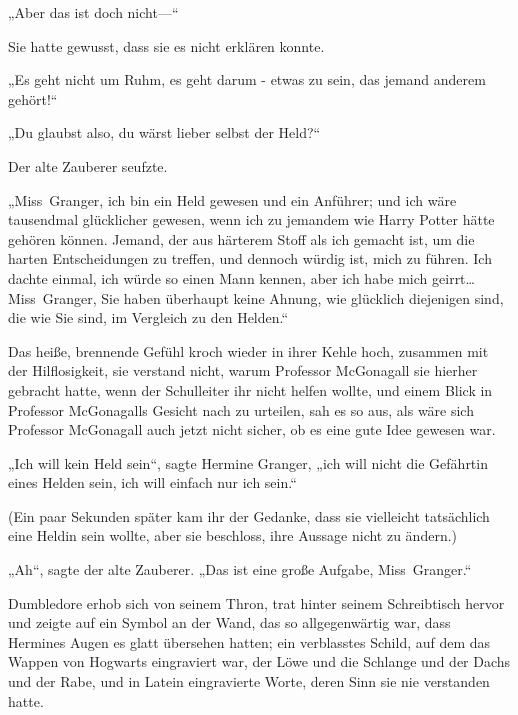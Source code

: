 {„Aber das ist doch nicht—“

Sie hatte gewusst, dass sie es nicht erklären konnte.

„Es geht nicht um Ruhm, es geht darum - etwas zu sein, das jemand anderem gehört!“

„Du glaubst also, du wärst lieber selbst der Held?“

Der alte Zauberer seufzte.

„Miss~Granger, ich bin ein Held gewesen und ein Anführer; und ich wäre tausendmal glücklicher gewesen, wenn ich zu jemandem wie Harry Potter hätte gehören können. Jemand, der aus härterem Stoff als ich gemacht ist, um die harten Entscheidungen zu treffen, und dennoch würdig ist, mich zu führen. Ich dachte einmal, ich würde so einen Mann kennen, aber ich habe mich geirrt… Miss~Granger, Sie haben überhaupt keine Ahnung, wie glücklich diejenigen sind, die wie Sie sind, im Vergleich zu den Helden.“

Das heiße, brennende Gefühl kroch wieder in ihrer Kehle hoch, zusammen mit der Hilflosigkeit, sie verstand nicht, warum Professor McGonagall sie hierher gebracht hatte, wenn der Schulleiter ihr nicht helfen wollte, und einem Blick in Professor McGonagalls Gesicht nach zu urteilen, sah es so aus, als wäre sich Professor McGonagall auch jetzt nicht sicher, ob es eine gute Idee gewesen war.

„Ich will kein Held sein“, sagte Hermine Granger, „ich will nicht die Gefährtin eines Helden sein, ich will einfach nur ich sein.“

(Ein paar Sekunden später kam ihr der Gedanke, dass sie vielleicht tatsächlich eine Heldin sein wollte, aber sie beschloss, ihre Aussage nicht zu ändern.)

„Ah“, sagte der alte Zauberer. „Das ist eine große Aufgabe, Miss~Granger.“

Dumbledore erhob sich von seinem Thron, trat hinter seinem Schreibtisch hervor und zeigte auf ein Symbol an der Wand, das so allgegenwärtig war, dass Hermines Augen es glatt übersehen hatten; ein verblasstes Schild, auf dem das Wappen von Hogwarts eingraviert war, der Löwe und die Schlange und der Dachs und der Rabe, und in Latein eingravierte Worte, deren Sinn sie nie verstanden hatte.

}
